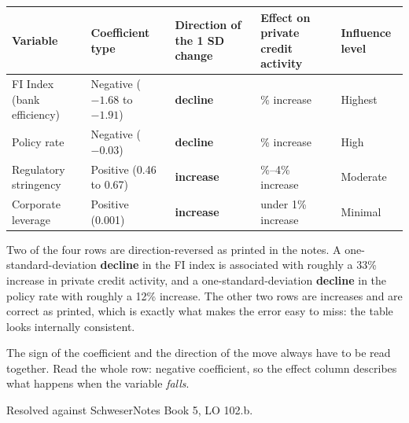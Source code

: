 \begin{center}
\renewcommand{\arraystretch}{1.25}
\small
\begin{tabularx}{\textwidth}{@{}p{3.5cm} p{3.0cm} p{2.5cm}
                              >{\raggedright\arraybackslash}X p{1.7cm}@{}}
\toprule
\rowcolor{FRMSoft}
{\sffamily\bfseries\color{FRMNavy}Variable} &
{\sffamily\bfseries\color{FRMNavy}Coefficient type} &
{\sffamily\bfseries\color{FRMNavy}Direction of the 1 SD change} &
{\sffamily\bfseries\color{FRMNavy}Effect on private credit activity} &
{\sffamily\bfseries\color{FRMNavy}Influence level}\\
\midrule
FI Index (bank efficiency) & Negative ($-1.68$ to $-1.91$) &
\textcolor{FRMRed}{\bfseries decline} & 33\% increase & Highest\\
Policy rate & Negative ($-0.03$) &
\textcolor{FRMRed}{\bfseries decline} & 12\% increase & High\\
Regulatory stringency & Positive (0.46 to 0.67) &
\textcolor{FRMGreen}{\bfseries increase} & 2\%--4\% increase & Moderate\\
Corporate leverage & Positive (0.001) &
\textcolor{FRMGreen}{\bfseries increase} & under 1\% increase & Minimal\\
\bottomrule
\end{tabularx}
\end{center}

\begin{citrapbox}[title={The correction, stated plainly}]
Two of the four rows are direction-reversed as printed in the notes. A one-standard-deviation
\textbf{decline} in the FI index is associated with roughly a 33\% increase in private credit
activity, and a one-standard-deviation \textbf{decline} in the policy rate with roughly a 12\%
increase. The other two rows are increases and are correct as printed, which is exactly what
makes the error easy to miss: the table looks internally consistent.\par\vspace{4pt}
The sign of the coefficient and the direction of the move always have to be read together.
Read the whole row: negative coefficient, so the effect column describes what happens when
the variable \emph{falls}.\par\vspace{4pt}
{\footnotesize\color{FRMGrey}Resolved against SchweserNotes Book 5, LO 102.b. \schweserbadge}
\end{citrapbox}

